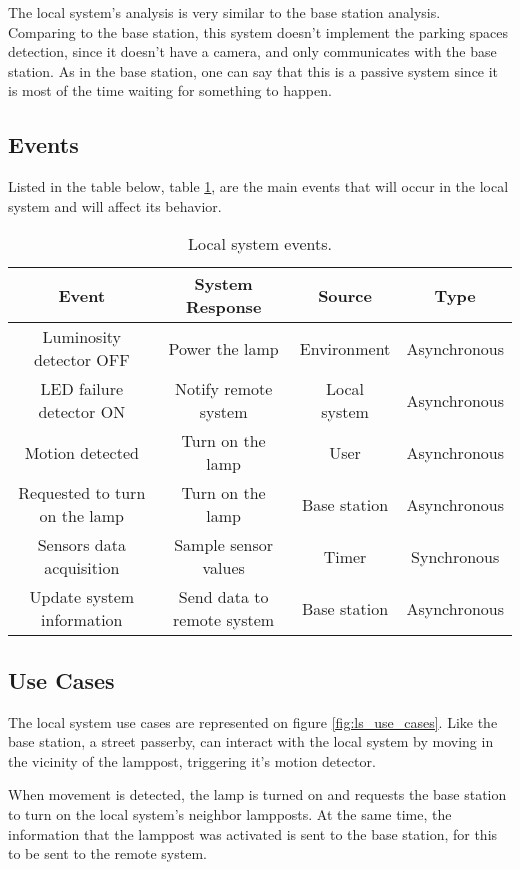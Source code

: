 The local system's analysis is very similar to the base station analysis. Comparing to the base station, this system doesn't implement the parking spaces detection, since it doesn't have a camera, and only communicates with the base station. As in the base station, one can say that this is a passive system since it is most of the time waiting for something to happen.

\subsection{Events}
Listed in the table below, table \ref{table:bs_events}, are the main events that will occur in the local system and will affect its behavior. 

\begin{table}[h]
	\centering
	\resizebox{\columnwidth}{!}
	{
	\begin{tabular}{||c | c | c | c||} 
		\hline
		\textbf{Event} & \textbf{System Response} & \textbf{Source} & \textbf{Type}\\
		\hline\hline
Luminosity detector OFF & Power the lamp & Environment & Asynchronous\\\hline
LED failure detector ON & Notify remote system & Local system & Asynchronous\\\hline
Motion detected & Turn on the lamp & User & Asynchronous\\\hline
Requested to turn on the lamp & Turn on the lamp & Base station & Asynchronous\\\hline
Sensors data acquisition & Sample sensor values & Timer & Synchronous\\\hline
Update system information & Send data to remote system & Base station & Asynchronous\\
		\hline
	\end{tabular}
	}
	
	\caption{Local system events.}
	\label{table:bs_events}
\end{table}

\subsection{Use Cases}
The local system use cases are represented on figure \ref{fig:ls_use_cases}. Like the base station, a street passerby, can interact with the local system by moving in the vicinity of the lamppost, triggering it's motion detector.

When movement is detected, the lamp is turned on and requests the base station to turn on the local system's neighbor lampposts. At the same time, the information that the lamppost was activated is sent to the base station, for this to be sent to the remote system.

